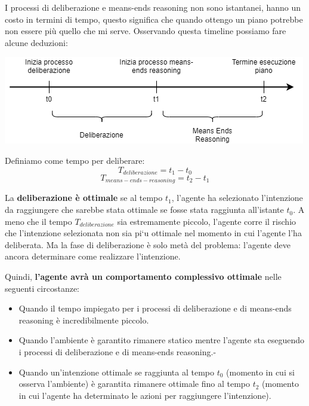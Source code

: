 I processi di deliberazione e means-ends reasoning non sono istantanei, hanno un costo in termini di tempo, questo significa che quando ottengo un piano potrebbe non essere più quello che mi serve. Osservando questa timeline possiamo fare alcune deduzioni:

\begin{center}
    \includegraphics[scale=0.6]{images/deliberazion_meansend_timechart.png}
\end{center}

Definiamo come tempo per deliberare:
\begin{displaymath}
    T_{deliberazione} = t_1 - t_0
\end{displaymath}
\begin{displaymath}
    T_{means-ends-reasoning} = t_2 - t_1
\end{displaymath}

La \textbf{deliberazione è ottimale} se al tempo $t_1$, l’agente ha selezionato l’intenzione da raggiungere che sarebbe stata ottimale se fosse stata raggiunta all’istante $t_0$. A meno che il tempo $T_{deliberazione}$ sia estremamente piccolo, l’agente corre il rischio che l’intenzione selezionata non sia pi`u ottimale nel momento in cui l’agente l’ha deliberata. Ma la fase di deliberazione è solo metà del problema: l’agente deve ancora determinare come realizzare l’intenzione. 

Quindi, \textbf{l’agente avrà un comportamento complessivo ottimale} nelle seguenti circostanze:
\begin{itemize}
    \item Quando il tempo impiegato per i processi di deliberazione e di means-ends reasoning è incredibilmente piccolo.
    \item Quando l'ambiente è garantito rimanere statico mentre l’agente sta eseguendo i processi di deliberazione e di means-ends reasoning.-
    \item Quando un’intenzione ottimale se raggiunta al tempo $t_0$ (momento in cui si osserva l'ambiente) è garantita rimanere ottimale fino al tempo $t_2$ (momento in cui l’agente ha determinato le azioni per raggiungere l’intenzione).
\end{itemize}